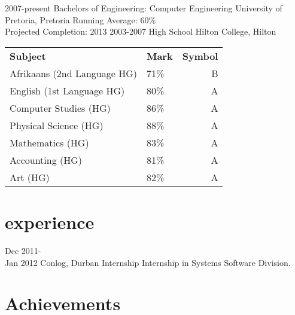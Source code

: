 \documentclass[]{friggeri-cv}
\begin{document}
\begin{entrylist}
  \entry
    {2007-present}
    {Bachelors of Engineering: Computer Engineering}
    {University of Pretoria, Pretoria}
    {
		Running Average: 60\% \\
		Projected Completion: 2013}
  \entry
    {2003-2007}
    {High School}
    {Hilton College, Hilton}
    {\begin{tabular}{p{5cm} p{1.5cm} r}
    		\textbf{Subject} & \textbf{Mark} & \textbf{Symbol}\\   		Afrikaans (2nd Language HG) & 71\% & B\\
    		English (1st Language HG) & 80\% & A\\
    		Computer Studies (HG) & 86\% & A\\
    		Physical Science (HG) & 88\% & A\\
    		Mathematics (HG) & 83\% & A\\
    		Accounting (HG) & 81\% & A\\
    		Art (HG) & 82\% & A\\
	\end{tabular}}
\end{entrylist}

\section{experience}

\begin{entrylist}
  \entry
    {Dec 2011-\\ Jan 2012}
    {Conlog, Durban}
    {Internship}
    {Internship in Systems Software Division.}
\end{entrylist}

\section{Achievements}
\end{document}
